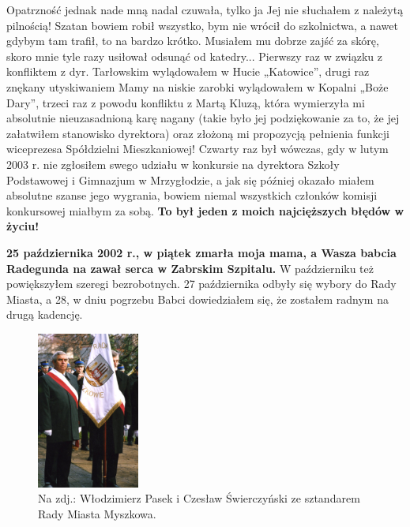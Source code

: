 Opatrzność jednak nade mną nadal czuwała, tylko ja Jej nie słuchałem z należytą pilnością! Szatan bowiem robił wszystko, bym nie wrócił do szkolnictwa, a nawet gdybym tam trafił, to na bardzo krótko. Musiałem mu dobrze zajść za skórę, skoro mnie tyle razy usiłował odsunąć od katedry... Pierwszy raz w związku z konfliktem z dyr. Tarłowskim wylądowałem w Hucie „Katowice”, drugi raz znękany utyskiwaniem Mamy na niskie zarobki wylądowałem w Kopalni „Boże Dary”, trzeci raz z powodu konfliktu z Martą Kluzą, która wymierzyła mi absolutnie nieuzasadnioną karę nagany (takie było jej podziękowanie za to, że jej załatwiłem stanowisko dyrektora) oraz złożoną mi propozycją pełnienia funkcji wiceprezesa Spółdzielni Mieszkaniowej! Czwarty raz był wówczas, gdy w lutym 2003 r. nie zgłosiłem swego udziału w konkursie na dyrektora Szkoły Podstawowej i Gimnazjum w Mrzygłodzie, a jak się później okazało miałem absolutne szanse jego wygrania, bowiem niemal wszystkich członków komisji konkursowej miałbym za sobą. \textbf{To był jeden z moich najcięższych błędów w życiu!}

\textbf{25 października 2002 r., w piątek zmarła moja mama, a Wasza babcia Radegunda na zawał serca w Zabrskim Szpitalu.} W październiku też powiększyłem szeregi bezrobotnych. 27 października odbyły się wybory do Rady Miasta, a 28, w dniu pogrzebu Babci dowiedziałem się, że zostałem radnym na drugą kadencję.
\begin{figure}[!h]
\begin{center}
\includegraphics[width=0.3\textwidth]{photo/czeslaw_swierczynski_ze_sztandarem_rady_miasta.jpg}
\caption[Poczet sztandarowy]{Na zdj.: Włodzimierz Pasek i Czesław Świerczyński ze sztandarem Rady Miasta Myszkowa.}
\end{center}
\end{figure}

